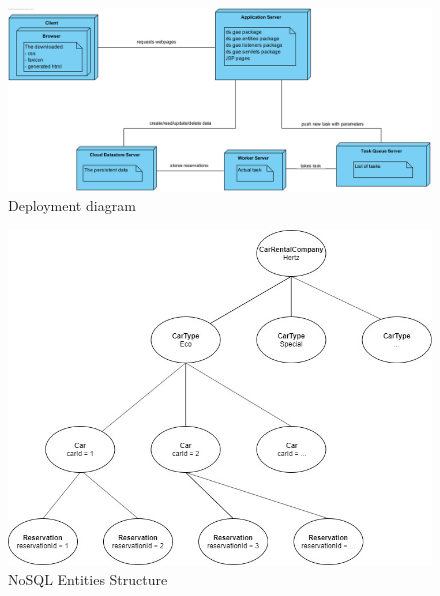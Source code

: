 \documentclass{ds-report}
\begin{document}
			\clearpage
	
	


\begin{figure}
  \includegraphics[width=\linewidth]{GAE_opdracht_2_deployment.png}
  \caption{Deployment diagram}
  \label{fig:deployment_diagram}
\end{figure}	

\begin{figure}
  \includegraphics[width=\linewidth]{GAE_opdracht_2_structure.jpg}
  \caption{NoSQL Entities Structure}
  \label{fig:structure}
\end{figure}

	
	\clearpage


	
\end{document}
